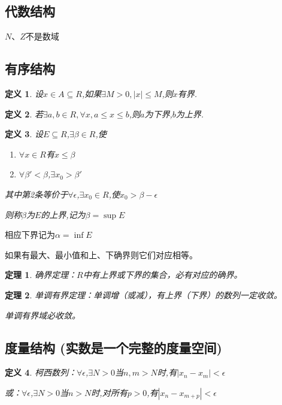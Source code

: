 \documentclass[UTF8]{ctexbook}
\newtheorem{definition}{定义}[chapter]
\newtheorem{thm}{定理}[chapter]
\begin{document}
\subsection{代数结构}
$N$、$Z$不是数域

\subsection{有序结构}
\begin{definition}
    设$x \in A \subseteq R$,如果$\exists M > 0, |x| \leq M$,则$x$有界.
\end{definition}

\begin{definition}
    若$\exists a, b \in R , \forall x, a \leq x \leq b$,则$a$为下界,$b$为上界.
\end{definition}

\begin{definition}
    设$E \subseteq R$,$\exists \beta \in R$,使
    \begin{enumerate}
        \item $\forall x \in R$有$x \leq \beta$
        \item $\forall  \beta' < \beta$,$\exists x_0 > \beta'$
    \end{enumerate}
    其中第2条等价于$\forall \epsilon$,$\exists x_0 \in R$,使$x_0 > \beta - \epsilon$
    
    则称$\beta $为$E$的上界,记为$\beta = \sup E$
\end{definition}

相应下界记为$\alpha = \inf E$

如果有最大、最小值和上、下确界则它们对应相等。

\begin{thm}
    确界定理：$R$中有上界或下界的集合，必有对应的确界。
\end{thm}

\begin{thm}
    单调有界定理：单调增（或减），有上界（下界）的数列一定收敛。

    单调有界域必收敛。
\end{thm}

\subsection{度量结构 (实数是一个完整的度量空间)}


\begin{definition}
    柯西数列：$\forall \epsilon$,$\exists N > 0 $当$n,m > N$时,有$|x_n - x_m| < \epsilon$
    
    或：$\forall \epsilon$,$\exists N > 0 $当$n > N$时,对所有$p > 0$,有$|x_n - x_{m + p}| < \epsilon$
\end{definition}
\end{document}
